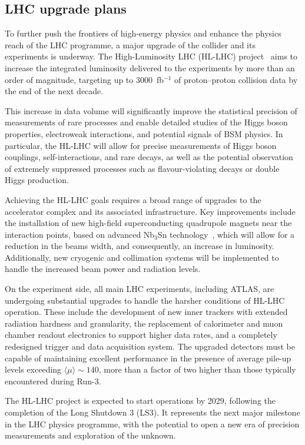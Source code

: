 \subsection{LHC upgrade plans}

To further push the frontiers of high-energy physics and enhance the physics reach of the LHC programme, a major upgrade of the collider and its experiments is underway. The High-Luminosity LHC (HL-LHC) project~\cite{HLLHC} aims to increase the integrated luminosity delivered to the experiments by more than an order of magnitude, targeting up to 3000~fb$^{-1}$ of proton--proton collision data by the end of the next decade.

This increase in data volume will significantly improve the statistical precision of measurements of rare processes and enable detailed studies of the Higgs boson properties, electroweak interactions, and potential signals of BSM physics. In particular, the HL-LHC will allow for precise measurements of Higgs boson couplings, self-interactions, and rare decays, as well as the potential observation of extremely suppressed processes such as flavour-violating decays or double Higgs production.

Achieving the HL-LHC goals requires a broad range of upgrades to the accelerator complex and its associated infrastructure. Key improvements include the installation of new high-field superconducting quadrupole magnets near the interaction points, based on advanced Nb$_3$Sn technology~\cite{Mangiarotti:2770766}, which will allow for a reduction in the beams width, and consequently, an increase in luminosity. Additionally, new cryogenic and collimation systems will be implemented to handle the increased beam power and radiation levels.

On the experiment side, all main LHC experiments, including ATLAS, are undergoing substantial upgrades to handle the harsher conditions of HL-LHC operation. These include the development of new inner trackers with extended radiation hardness and granularity, the replacement of calorimeter and muon chamber readout electronics to support higher data rates, and a completely redesigned trigger and data acquisition system. The upgraded detectors must be capable of maintaining excellent performance in the presence of average pile-up levels exceeding $\langle\mu\rangle \sim 140$, more than a factor of two higher than those typically encountered during Run-3.

The HL-LHC project is expected to start operations by 2029, following the completion of the Long Shutdown 3 (LS3). It represents the next major milestone in the LHC physics programme, with the potential to open a new era of precision measurements and exploration of the unknown.


